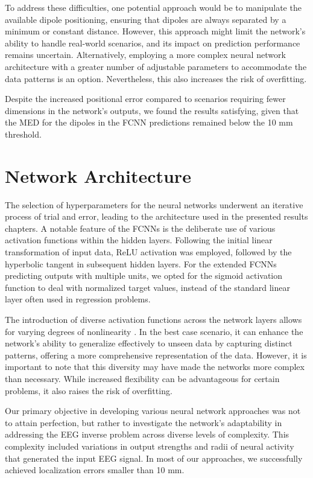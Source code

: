 \documentclass[a4paper, UKenglish, 11pt]{uiomaster}
\begin{document}
To address these difficulties, one potential approach would be to manipulate the available dipole positioning, ensuring that dipoles are always separated by a minimum or constant distance. However, this approach might limit the network's ability to handle real-world scenarios, and its impact on prediction performance remains uncertain. Alternatively, employing a more complex neural network architecture with a greater number of adjustable parameters to accommodate the data patterns is an option. Nevertheless, this also increases the risk of overfitting.

Despite the increased positional error compared to scenarios requiring fewer dimensions in the network's outputs, we found the results satisfying, given that the MED for the dipoles in the FCNN predictions remained below the 10 mm threshold.


\section{Network Architecture} \label{sec:architecture}
The selection of hyperparameters for the neural networks underwent an iterative process of trial and error, leading to the architecture used in the presented results chapters. A notable feature of the FCNNs is the deliberate use of various activation functions within the hidden layers. Following the initial linear transformation of input data, ReLU activation was employed, followed by the hyperbolic tangent in subsequent hidden layers. For the extended FCNNs predicting outputs with multiple units, we opted for the sigmoid activation function to deal with normalized target values, instead of the standard linear layer often used in regression problems.

The introduction of diverse activation functions across the network layers allows for varying degrees of nonlinearity . In the best case scenario, it can enhance the network's ability to generalize effectively to unseen data by capturing distinct patterns, offering a more comprehensive representation of the data. However, it is important to note that this diversity may have made the networks more complex than necessary. While increased flexibility can be advantageous for certain problems, it also raises the risk of overfitting.

Our primary objective in developing various neural network approaches was not to attain perfection, but rather to investigate the network's adaptability in addressing the EEG inverse problem across diverse levels of complexity. This complexity included variations in output strengths and radii of neural activity that generated the input EEG signal. In most of our approaches, we successfully achieved localization errors smaller than 10 mm.
\end{document}
